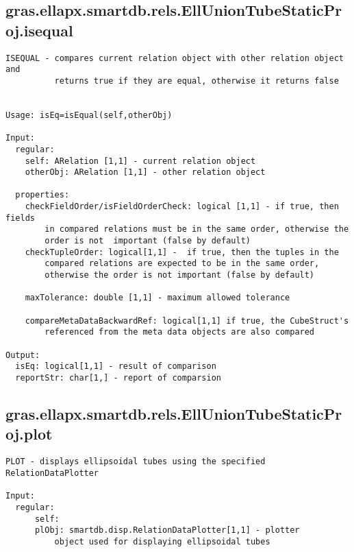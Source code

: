 \subsection{\texorpdfstring{gras.ellapx.smartdb.rels.EllUnionTubeStaticProj.isequal}{isequal}}\label{method:gras.ellapx.smartdb.rels.EllUnionTubeStaticProj.isequal}
\begin{verbatim}
ISEQUAL - compares current relation object with other relation object and
          returns true if they are equal, otherwise it returns false


Usage: isEq=isEqual(self,otherObj)

Input:
  regular:
    self: ARelation [1,1] - current relation object
    otherObj: ARelation [1,1] - other relation object

  properties:
    checkFieldOrder/isFieldOrderCheck: logical [1,1] - if true, then fields
        in compared relations must be in the same order, otherwise the
        order is not  important (false by default)
    checkTupleOrder: logical[1,1] -  if true, then the tuples in the
        compared relations are expected to be in the same order,
        otherwise the order is not important (false by default)

    maxTolerance: double [1,1] - maximum allowed tolerance

    compareMetaDataBackwardRef: logical[1,1] if true, the CubeStruct's
        referenced from the meta data objects are also compared

Output:
  isEq: logical[1,1] - result of comparison
  reportStr: char[1,] - report of comparsion
\end{verbatim}
\subsection{\texorpdfstring{gras.ellapx.smartdb.rels.EllUnionTubeStaticProj.plot}{plot}}\label{method:gras.ellapx.smartdb.rels.EllUnionTubeStaticProj.plot}
\begin{verbatim}
PLOT - displays ellipsoidal tubes using the specified RelationDataPlotter

Input:
  regular:
      self:
      plObj: smartdb.disp.RelationDataPlotter[1,1] - plotter
          object used for displaying ellipsoidal tubes
\end{verbatim}
